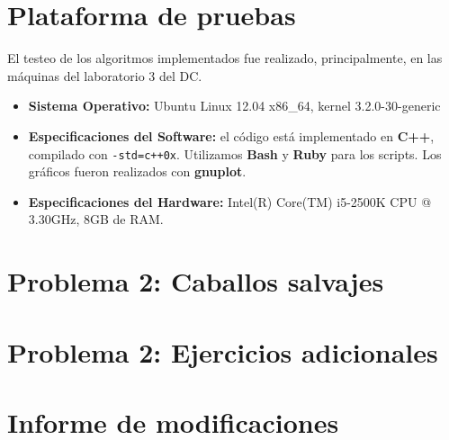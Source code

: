 \documentclass[a4paper]{article}
\begin{document}
\section{Plataforma de pruebas}
El testeo de los algoritmos implementados fue realizado, principalmente, en las máquinas del laboratorio 3 del DC. \newline
\begin{itemize}
  \item \textbf{Sistema Operativo:} Ubuntu Linux 12.04 x86_64, kernel 3.2.0-30-generic

  \item \textbf{Especificaciones del Software:} el código está implementado en \textbf{C++}, compilado con \verb|-std=c++0x|.
  Utilizamos \textbf{Bash} y \textbf{Ruby} para los scripts. Los gráficos fueron realizados con \textbf{gnuplot}.

  \item \textbf{Especificaciones del Hardware:} Intel(R) Core(TM) i5-2500K CPU @ 3.30GHz, 8GB de RAM.
\end{itemize}




% 


\newpage
\section{Problema 2: Caballos salvajes}



\newpage
\section{Problema 2: Ejercicios adicionales}



\newpage
\section{Informe de modificaciones}



% 



\newpage
\end{document}
